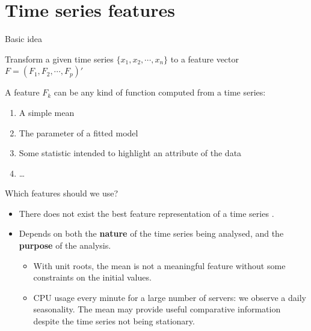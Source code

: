 \documentclass[11pt,ignorenonframetext,compress]{beamer}
\providecommand{\tightlist}{%
  \setlength{\itemsep}{0pt}\setlength{\parskip}{0pt}}
\begin{document}
\section{Time series features}\label{time-series-features}

\begin{frame}{Basic idea}

  Transform a given time series \(\{x_1, x_2, \cdots, x_n\}\) to a feature
  vector \(F = (F_1, F_2, \cdots, F_p)'\) \citep{kang2017visualising,cikm2015}

  \begin{block}{A feature \(F_k\) can be any kind of function computed
      from a time series:}

    \begin{enumerate}
      \def\labelenumi{\arabic{enumi}.}
      \tightlist
    \item
      A simple mean
    \item
      The parameter of a fitted model
    \item
      Some statistic intended to highlight an attribute of the data
    \item
      \ldots{}
    \end{enumerate}

  \end{block}

\end{frame}

\begin{frame}{Which features should we use?}

  \begin{itemize}
  \item
    There does not exist the best feature representation of a time series
    \citep{fulcher2018feature}.
  \item
    Depends on both the \textbf{nature} of the time series being analysed,
    and the \textbf{purpose} of the analysis.

    \begin{itemize}
    \item
      With unit roots, the mean is not a meaningful feature without some
      constraints on the initial values.
    \item
      CPU usage every minute for a large number of servers: we observe a
      daily seasonality. The mean may provide useful comparative
      information despite the time series not being stationary.
    \end{itemize}
  \end{itemize}

\end{frame}
\end{document}
